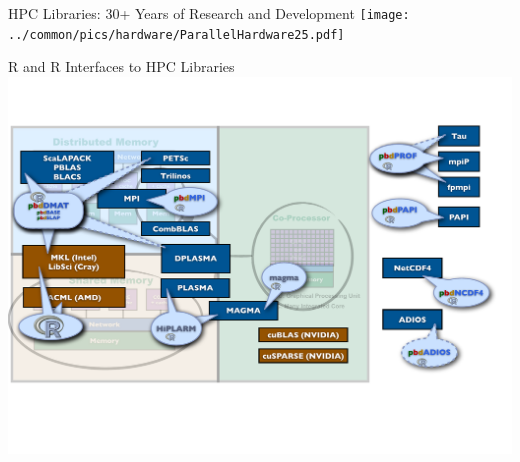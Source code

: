 \begin{frame}{HPC Libraries: 30+ Years of Research and Development}
\texttt{[image: ../common/pics/hardware/ParallelHardware25.pdf]}
\end{frame}

\begin{frame}{R and \pbdR R Interfaces to HPC Libraries}
\includegraphics[height=\textheight]
{../common/pics/hardware/ParallelHardware26.pdf}
\end{frame}




